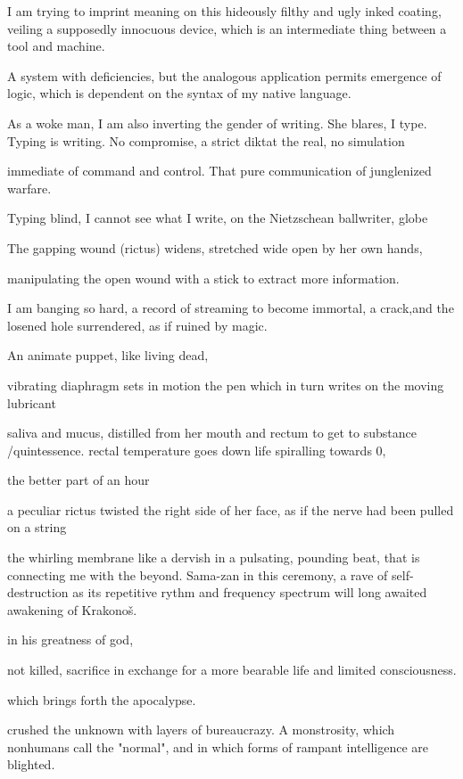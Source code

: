 \documentclass{article}
\begin{document}
I am trying to imprint meaning 
on this hideously filthy and ugly inked coating,
veiling a supposedly innocuous device, 
which is an intermediate thing between a tool and machine.


A system with deficiencies,
but the analogous application permits emergence of logic, 
which is dependent on the syntax of my native language. 

As a woke man, I am also inverting the gender of writing. 
She blares, I type. Typing is writing. 
No compromise, a strict diktat
the real, no simulation

immediate of command and control. 
That pure communication of junglenized warfare. 

Typing blind, 
I cannot see what I write, on the Nietzschean ballwriter, 
globe


The gapping wound (rictus) widens, 
stretched wide open by her own hands, 

manipulating the open wound with a stick to extract more information. 


I am banging so hard, a record of streaming to become immortal, 
a crack,and the losened hole surrendered, as if ruined by magic. 


An animate puppet, like living dead, 


vibrating diaphragm sets in motion the pen 
which in turn writes on the moving lubricant

saliva and mucus, 
distilled from her mouth and rectum to get to substance /quintessence. 
rectal temperature goes down
life spiralling towards 0, 

the better part of an hour

a peculiar 
rictus twisted the right side of her face, as if the nerve 
had been pulled on a string



the whirling membrane like a dervish
in a pulsating, pounding beat, that is connecting me with the beyond.  
Sama-zan in this ceremony, 
a rave of self-destruction
as its repetitive rythm and frequency spectrum 
will long awaited awakening of Krakonoš.

in his greatness of god, 

not killed,
sacrifice in exchange for a more bearable life
and limited consciousness.

which brings forth the apocalypse.


crushed the unknown with layers of bureaucrazy. 
A monstrosity, which nonhumans call the "normal",
and in which forms of rampant intelligence are blighted. 
\end{document}
